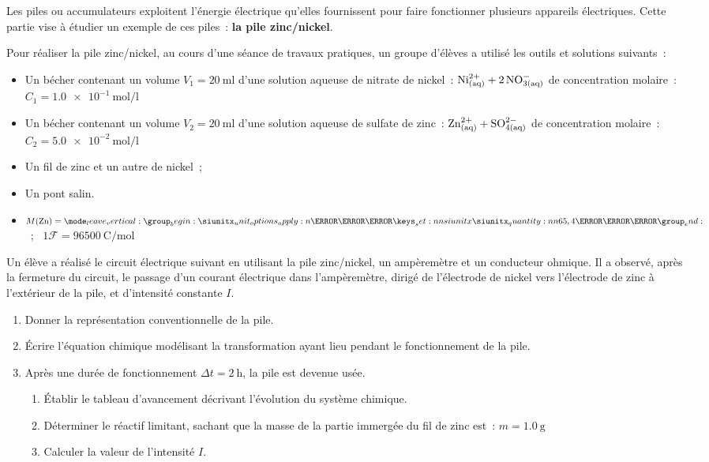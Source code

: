 Les piles ou accumulateurs exploitent l'énergie électrique qu'elles fournissent
pour faire fonctionner plusieurs appareils électriques. Cette partie vise à
étudier un exemple de ces piles~: \textbf{la pile zinc/nickel}.

Pour réaliser la pile zinc/nickel, au cours d'une séance de travaux pratiques,
un groupe d'élèves a utilisé les outils et solutions suivants~:
\begin{itemize}
    \item Un bécher contenant un volume $V_1=\qty{20}{\milli\litre}$ d'une
          solution aqueuse de nitrate de nickel~:
          ${\ce{Ni^{2+}_{(aq)} + 2NO^{-}_{3(aq)}}}$ de concentration molaire~:
          $C_1=\qty{1,0e-1}{\mole\per\litre}$
    \item Un bécher contenant un volume $V_2=\qty{20}{\milli\litre}$ d'une
          solution aqueuse de sulfate de zinc~:
          ${\ce{Zn^{2+}_{(aq)} + SO^{2-}_{4(aq)}}}$ de concentration molaire~:
          $C_2=\qty{5,0e-2}{\mole\per\litre}$
    \item Un fil de zinc et un autre de nickel~;
    \item Un pont salin.
\end{itemize}

\begin{donnees}
    \begin{itemize}
        \item ${M(\ce{Zn})=\qty{65,4}{\gram\per\mole}}$~; \
              ${1\mathcal{F}=\qty{96500}{\coulomb\per\mole}}$
    \end{itemize}
\end{donnees}
Un élève a réalisé le circuit électrique suivant en utilisant la pile
zinc/nickel, un ampèremètre et un conducteur ohmique. Il a observé, après la
fermeture du circuit, le passage d'un courant électrique dans l'ampèremètre,
dirigé de l'électrode de nickel vers l'électrode de zinc à l'extérieur de la
pile, et d'intensité constante $I$.

\begin{enumerate}
    \item Donner la représentation conventionnelle de la pile.
    \item Écrire l'équation chimique modélisant la transformation ayant lieu
          pendant le fonctionnement de la pile.
    \item Après une durée de fonctionnement $\Delta t=\qty{2}{\hour}$, la pile
          est devenue usée.
          \begin{enumerate}
              \item Établir le tableau d'avancement décrivant l'évolution du
                    système chimique.
              \item Déterminer le réactif limitant, sachant que la masse de la
                    partie immergée du fil de zinc est~: $m=\qty{1,0}{\gram}$
              \item Calculer la valeur de l'intensité $I$.
          \end{enumerate}
\end{enumerate}

